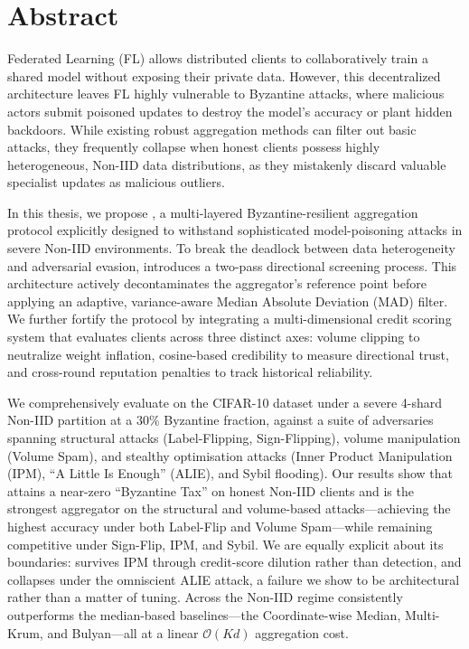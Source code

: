 \documentclass[../main.tex]{subfiles}
\begin{document}
\chapter*{Abstract}
Federated Learning (FL) allows distributed clients to collaboratively train a shared model without exposing their private data. However, this decentralized architecture leaves FL highly vulnerable to Byzantine attacks, where malicious actors submit poisoned updates to destroy the model's accuracy or plant hidden backdoors. While existing robust aggregation methods can filter out basic attacks, they frequently collapse when honest clients possess highly heterogeneous, Non-IID data distributions, as they mistakenly discard valuable specialist updates as malicious outliers.

In this thesis, we propose \textbf{\aegis{}}, a multi-layered Byzantine-resilient aggregation protocol explicitly designed to withstand sophisticated model-poisoning attacks in severe Non-IID environments. To break the deadlock between data heterogeneity and adversarial evasion, \aegis{} introduces a two-pass directional screening process. This architecture actively decontaminates the aggregator's reference point before applying an adaptive, variance-aware Median Absolute Deviation (MAD) filter. We further fortify the protocol by integrating a multi-dimensional credit scoring system that evaluates clients across three distinct axes: volume clipping to neutralize weight inflation, cosine-based credibility to measure directional trust, and cross-round reputation penalties to track historical reliability.

We comprehensively evaluate \aegis{} on the CIFAR-10 dataset under a severe 4-shard Non-IID partition at a $30\%$ Byzantine fraction, against a suite of adversaries spanning structural attacks (Label-Flipping, Sign-Flipping), volume manipulation (Volume Spam), and stealthy optimisation attacks (Inner Product Manipulation (IPM), ``A Little Is Enough'' (ALIE), and Sybil flooding). Our results show that \aegis{} attains a near-zero ``Byzantine Tax'' on honest Non-IID clients and is the strongest aggregator on the structural and volume-based attacks---achieving the highest accuracy under both Label-Flip and Volume Spam---while remaining competitive under Sign-Flip, IPM, and Sybil. We are equally explicit about its boundaries: \aegis{} survives IPM through credit-score dilution rather than detection, and collapses under the omniscient ALIE attack, a failure we show to be architectural rather than a matter of tuning. Across the Non-IID regime \aegis{} consistently outperforms the median-based baselines---the Coordinate-wise Median, Multi-Krum, and Bulyan---all at a linear $\mathcal{O}(Kd)$ aggregation cost.
\end{document}

